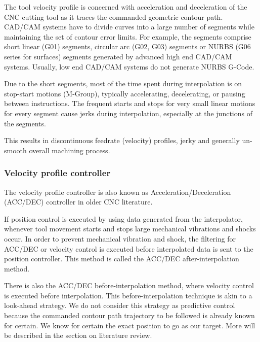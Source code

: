 The tool velocity profile is concerned with acceleration and deceleration of the CNC cutting tool as it traces the commanded geometric contour path. CAD/CAM systems have to divide curves into a large number of segments while maintaining the set of contour error limits. For example, the segments comprise short linear (G01) segments, circular arc (G02, G03) segments or NURBS (G06 series for surfaces) segments generated by advanced high end CAD/CAM systems.  Usually, low end CAD/CAM systems do not generate NURBS G-Code.

\begin{tcolorbox}[colback=green!15!white,colframe=red!75!black,title=Research consideration no. 1]
\justifying
Due to the short segments, most of the time spent during interpolation is on stop-start motions (M-Group), typically accelerating, decelerating, or pausing between instructions. The frequent starts and stops for very small linear motions for every segment cause jerks during interpolation, especially at the junctions of the segments. 
\vspace*{1\baselineskip}

This results in discontinuous feedrate (velocity) profiles, jerky and generally un-smooth overall machining process. 
\end{tcolorbox} 

\subsubsection{Velocity profile controller}

The velocity profile controller is also known as Acceleration/Deceleration (ACC/DEC) controller in older CNC literature.
\vspace*{1\baselineskip}

If position control is executed by using data generated from the interpolator, whenever tool movement starts and stops large mechanical vibrations and shocks occur. In order to prevent mechanical vibration and shock, the filtering for
ACC/DEC or velocity control is executed before interpolated data is sent to the position controller. This method is called the ACC/DEC after-interpolation method. 
\vspace*{1\baselineskip}

There is also the ACC/DEC before-interpolation method, where velocity control is executed before interpolation. This before-interpolation technique is akin to a look-ahead strategy. We do not consider this strategy as predictive control because the commanded contour path trajectory to be followed is already known for certain. We know for certain the exact position to go as our target.  More will be described in the section on literature review. 
\vspace*{1\baselineskip}

